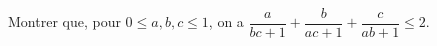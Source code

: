 Montrer que, pour $0 \leq a, b, c \leq 1$, on a $\dfrac{a}{bc + 1} + \dfrac{b}{ac + 1} + \dfrac{c}{ab + 1} \leq 2$.
